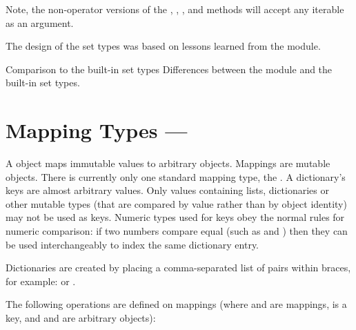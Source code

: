 Note, the non-operator versions of the ,
, , and
 methods will accept any iterable
as an argument.

The design of the set types was based on lessons learned from the
 module.
     
\begin{seealso}     
          {Comparison to the built-in set types}
          {Differences between the  module and the
           built-in set types.}					      
\end{seealso}
     

\section{Mapping Types ---  \label{typesmapping}}

A  object maps  immutable values to
arbitrary objects.  Mappings are mutable objects.  There is currently
only one standard mapping type, the .  A dictionary's keys are
almost arbitrary values.  Only values containing lists, dictionaries
or other mutable types (that are compared by value rather than by
object identity) may not be used as keys.
Numeric types used for keys obey the normal rules for numeric
comparison: if two numbers compare equal (such as  and
) then they can be used interchangeably to index the same
dictionary entry.

Dictionaries are created by placing a comma-separated list of
 pairs within braces, for example:
 or
.

The following operations are defined on mappings (where  and
 are mappings,  is a key, and  and  are
arbitrary objects):


